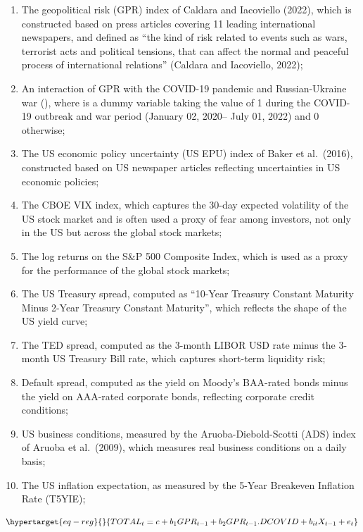 \documentclass[
  letterpaper,
  DIV=11,
  numbers=noendperiod]{scrartcl}
\providecommand{\tightlist}{%
  \setlength{\itemsep}{0pt}\setlength{\parskip}{0pt}}\usepackage{longtable,booktabs,array}
\begin{document}
\begin{enumerate}
\def\labelenumi{\arabic{enumi}.}
\tightlist
\item
  The geopolitical risk (GPR) index of Caldara and Iacoviello (2022),
  which is constructed based on press articles covering 11 leading
  international newspapers, and defined as ``the kind of risk related to
  events such as wars, terrorist acts and political tensions, that can
  affect the normal and peaceful process of international relations''
  (Caldara and Iacoviello, 2022);
\item
  An interaction of GPR with the COVID-19 pandemic and Russian-Ukraine
  war (), where is a dummy variable taking the value of 1 during the
  COVID-19 outbreak and war period (January 02, 2020-- July 01, 2022)
  and 0 otherwise;
\item
  The US economic policy uncertainty (US EPU) index of Baker et
  al.~(2016), constructed based on US newspaper articles reflecting
  uncertainties in US economic policies;
\item
  The CBOE VIX index, which captures the 30-day expected volatility of
  the US stock market and is often used a proxy of fear among investors,
  not only in the US but across the global stock markets;
\item
  The log returns on the S\&P 500 Composite Index, which is used as a
  proxy for the performance of the global stock markets;
\item
  The US Treasury spread, computed as ``10-Year Treasury Constant
  Maturity Minus 2-Year Treasury Constant Maturity'', which reflects the
  shape of the US yield curve;
\item
  The TED spread, computed as the 3-month LIBOR USD rate minus the
  3-month US Treasury Bill rate, which captures short-term liquidity
  risk;
\item
  Default spread, computed as the yield on Moody's BAA-rated bonds minus
  the yield on AAA-rated corporate bonds, reflecting corporate credit
  conditions;
\item
  US business conditions, measured by the Aruoba-Diebold-Scotti (ADS)
  index of Aruoba et al.~(2009), which measures real business conditions
  on a daily basis;
\item
  The US inflation expectation, as measured by the 5-Year Breakeven
  Inflation Rate (T5YIE);
\end{enumerate}

\begin{equation}\protect\hypertarget{eq-reg}{}{TOTAL_t=c+b_1GPR_{t-1}+b_2GPR_{t-1}.DCOVID+b_{it}X_{t-1}+e_t}\label{eq-reg}\end{equation}
\end{document}
